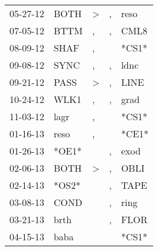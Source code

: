 \begin{supertabular}{p{0.07\textwidth}p{0.06\textwidth}p{0.02\textwidth}p{0.02\textwidth}p{0.06\textwidth}}
          05-27-12\textsuperscript{} &           BOTH\textsuperscript{} &     \textgreater &                , &           reso\textsuperscript{} \\
          07-05-12\textsuperscript{} &           BTTM\textsuperscript{} &                , &                , &           CML8\textsuperscript{} \\
          08-09-12\textsuperscript{} &           SHAF\textsuperscript{} &                , &                  &                            *CS1* \\
          09-08-12\textsuperscript{} &           SYNC\textsuperscript{} &                , &                , &           ldnc\textsuperscript{} \\
          09-21-12\textsuperscript{} &           PASS\textsuperscript{} &     \textgreater &                , &           LINE\textsuperscript{} \\
          10-24-12\textsuperscript{} &           WLK1\textsuperscript{} &                , &                , &           grad\textsuperscript{} \\
          11-03-12\textsuperscript{} &           lagr\textsuperscript{} &                , &                  &                            *CS1* \\
          01-16-13\textsuperscript{} &           reso\textsuperscript{} &                , &                  &                            *CE1* \\
          01-26-13\textsuperscript{} &                            *OE1* &                  &                , &           exod\textsuperscript{} \\
          02-06-13\textsuperscript{} &           BOTH\textsuperscript{} &     \textgreater &                , &           OBLI\textsuperscript{} \\
          02-14-13\textsuperscript{} &                            *OS2* &                  &                , &           TAPE\textsuperscript{} \\
          03-08-13\textsuperscript{} &           COND\textsuperscript{} &                  &                , &           ring\textsuperscript{} \\
          03-21-13\textsuperscript{} &           brth\textsuperscript{} &                  &                , &           FLOR\textsuperscript{} \\
          04-15-13\textsuperscript{} &           baba\textsuperscript{} &                  &                  &                            *CS1* \\

\end{supertabular}
